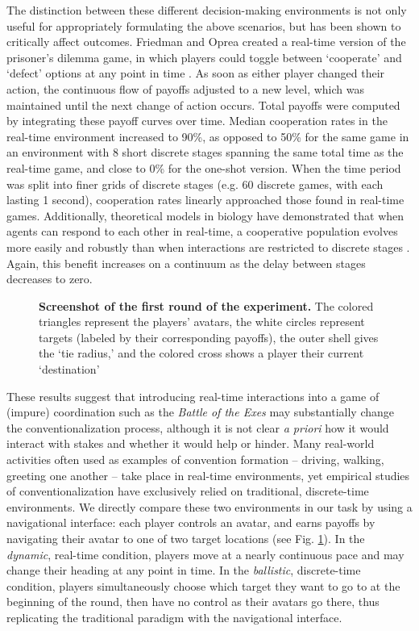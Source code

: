 \documentclass[10pt,letterpaper]{article}
\begin{document}
The distinction between these different decision-making environments is not only useful for appropriately formulating the above scenarios, but has been shown to critically affect outcomes. Friedman and Oprea created a real-time version of the prisoner's dilemma game, in which players could toggle between `cooperate' and `defect' options at any point in time \cite{FriedmanOprea12_ContinuousDilemma}. As soon as either player changed their action, the continuous flow of payoffs adjusted to a new level, which was maintained until the next change of action occurs. Total payoffs were computed by integrating these payoff curves over time. Median cooperation rates in the real-time environment increased to 90\%, as opposed to 50\% for the same game in an environment with 8 short discrete stages spanning the same total time as the real-time game, and close to 0\% for the one-shot version. When the time period was split into finer grids of discrete stages (e.g. 60 discrete games, with each lasting 1 second), cooperation rates linearly approached those found in real-time games. Additionally, theoretical models in biology have demonstrated that when agents can respond to each other in real-time, a cooperative population evolves more easily and robustly than when interactions are restricted to discrete stages \cite{vanDoornRiebliTaborsky14_CoactionReciprocityContinuousTime}. Again, this benefit increases on a continuum as the delay between stages decreases to zero. 

\begin{figure}
\centering
\caption{{\bf Screenshot of the first round of the experiment.} The colored triangles represent the players' avatars, the white circles represent targets (labeled by their corresponding payoffs), the outer shell gives the `tie radius,' and the colored cross shows a player their current `destination'}
\label{ex}
\end{figure}

These results suggest that introducing real-time interactions into a game of (impure) coordination such as the \emph{Battle of the Exes} may substantially change the conventionalization process, although it is not clear \emph{a priori} how it would interact with stakes and whether it would help or hinder. Many real-world activities often used as examples of convention formation -- driving, walking, greeting one another -- take place in real-time environments, yet empirical studies of conventionalization have exclusively relied on traditional, discrete-time environments. We directly compare these two environments in our task by using a navigational interface: each player controls an avatar, and earns payoffs by navigating their avatar to one of two target locations (see Fig. \ref{ex}). In the \emph{dynamic}, real-time condition, players move at a nearly continuous pace and may change their heading at any point in time. In the \emph{ballistic}, discrete-time condition, players simultaneously choose which target they want to go to at the beginning of the round, then have no control as their avatars go there, thus replicating the traditional paradigm with the navigational interface.
\end{document}
